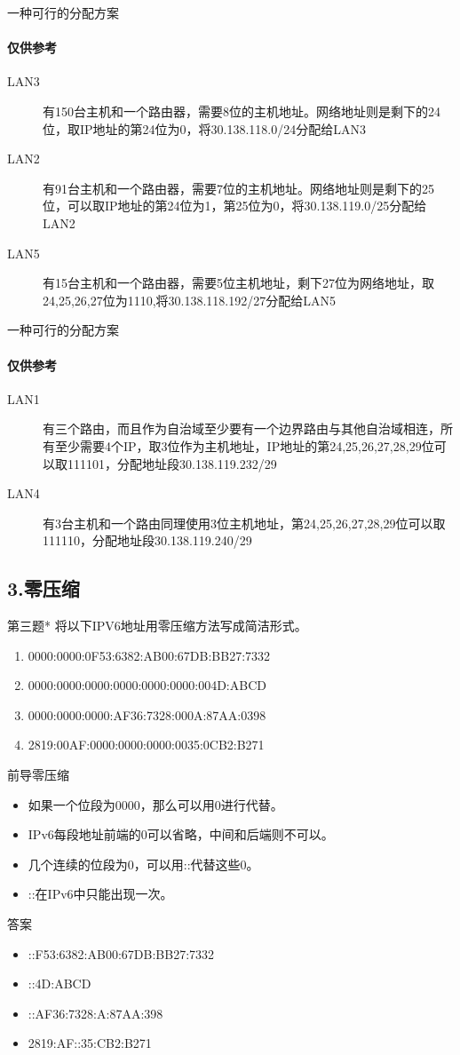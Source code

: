 \documentclass[presentation]{beamer}
\begin{document}
\begin{frame}{一种可行的分配方案}
	\framesubtitle{仅供参考}
	\begin{description}
		\item[LAN3]有150台主机和一个路由器，需要8位的主机地址。网络地址则是剩下的24位，取IP地址的第24位为0，将30.138.118.0/24分配给LAN3
		\item[LAN2]有91台主机和一个路由器，需要7位的主机地址。网络地址则是剩下的25位，可以取IP地址的第24位为1，第25位为0，将30.138.119.0/25分配给LAN2
		\item[LAN5]有15台主机和一个路由器，需要5位主机地址，剩下27位为网络地址，取24,25,26,27位为1110,将30.138.118.192/27分配给LAN5
	\end{description}
\end{frame}

\begin{frame}{一种可行的分配方案}
	\framesubtitle{仅供参考}
	\begin{description}
	\item[LAN1]有三个路由，而且作为自治域至少要有一个边界路由与其他自治域相连，所有至少需要4个IP，取3位作为主机地址，IP地址的第24,25,26,27,28,29位可以取111101，分配地址段30.138.119.232/29
	\item[LAN4] 有3台主机和一个路由同理使用3位主机地址，第24,25,26,27,28,29位可以取111110，分配地址段30.138.119.240/29
	\end{description}
\end{frame}

\subsection{3.零压缩}
\begin{frame}{第三题*}
	将以下IPV6地址用零压缩方法写成简洁形式。
	\begin{enumerate}
		\item 0000:0000:0F53:6382:AB00:67DB:BB27:7332
		\item 0000:0000:0000:0000:0000:0000:004D:ABCD
		\item 0000:0000:0000:AF36:7328:000A:87AA:0398
		\item 2819:00AF:0000:0000:0000:0035:0CB2:B271
	\end{enumerate}
	
\end{frame}

\begin{frame}{前导零压缩}
	\begin{itemize}
		\item 如果一个位段为0000，那么可以用0进行代替。
		\item IPv6每段地址前端的0可以省略，中间和后端则不可以。
		\item 几个连续的位段为0，可以用::代替这些0。
	    \item ::在IPv6中只能出现一次。
	\end{itemize}
\end{frame}

\begin{frame}{答案}
\begin{itemize}
	\item ::F53:6382:AB00:67DB:BB27:7332
	\item ::4D:ABCD
	\item ::AF36:7328:A:87AA:398
	\item 2819:AF::35:CB2:B271
\end{itemize}	
\end{frame}
\end{document}
